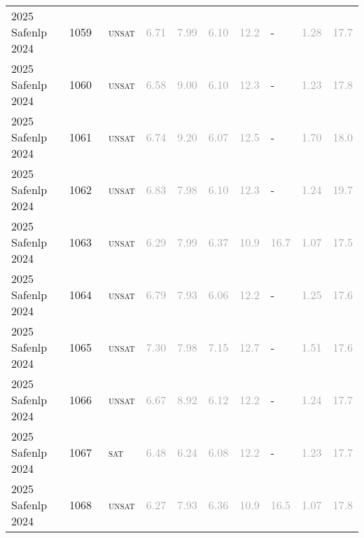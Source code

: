 \begin{center}
{\begin{longtable}{@{}llllllllll@{}}
2025 Safenlp 2024 & 1059 & ~\textsc{unsat} & \textcolor{darkgray}{6.71} & \textcolor{darkgray}{7.99} & \textcolor{darkgray}{6.10} & \textcolor{darkgray}{12.2} & - & \textcolor{darkgray}{1.28} & \textcolor{darkgray}{17.7} \\
2025 Safenlp 2024 & 1060 & ~\textsc{unsat} & \textcolor{darkgray}{6.58} & \textcolor{darkgray}{9.00} & \textcolor{darkgray}{6.10} & \textcolor{darkgray}{12.3} & - & \textcolor{darkgray}{1.23} & \textcolor{darkgray}{17.8} \\
2025 Safenlp 2024 & 1061 & ~\textsc{unsat} & \textcolor{darkgray}{6.74} & \textcolor{darkgray}{9.20} & \textcolor{darkgray}{6.07} & \textcolor{darkgray}{12.5} & - & \textcolor{darkgray}{1.70} & \textcolor{darkgray}{18.0} \\
2025 Safenlp 2024 & 1062 & ~\textsc{unsat} & \textcolor{darkgray}{6.83} & \textcolor{darkgray}{7.98} & \textcolor{darkgray}{6.10} & \textcolor{darkgray}{12.3} & - & \textcolor{darkgray}{1.24} & \textcolor{darkgray}{19.7} \\
2025 Safenlp 2024 & 1063 & ~\textsc{unsat} & \textcolor{darkgray}{6.29} & \textcolor{darkgray}{7.99} & \textcolor{darkgray}{6.37} & \textcolor{darkgray}{10.9} & \textcolor{darkgray}{16.7} & \textcolor{darkgray}{1.07} & \textcolor{darkgray}{17.5} \\
2025 Safenlp 2024 & 1064 & ~\textsc{unsat} & \textcolor{darkgray}{6.79} & \textcolor{darkgray}{7.93} & \textcolor{darkgray}{6.06} & \textcolor{darkgray}{12.2} & - & \textcolor{darkgray}{1.25} & \textcolor{darkgray}{17.6} \\
2025 Safenlp 2024 & 1065 & ~\textsc{unsat} & \textcolor{darkgray}{7.30} & \textcolor{darkgray}{7.98} & \textcolor{darkgray}{7.15} & \textcolor{darkgray}{12.7} & - & \textcolor{darkgray}{1.51} & \textcolor{darkgray}{17.6} \\
2025 Safenlp 2024 & 1066 & ~\textsc{unsat} & \textcolor{darkgray}{6.67} & \textcolor{darkgray}{8.92} & \textcolor{darkgray}{6.12} & \textcolor{darkgray}{12.2} & - & \textcolor{darkgray}{1.24} & \textcolor{darkgray}{17.7} \\
2025 Safenlp 2024 & 1067 & ~\textsc{sat} & \textcolor{darkgray}{6.48} & \textcolor{darkgray}{6.24} & \textcolor{darkgray}{6.08} & \textcolor{darkgray}{12.2} & - & \textcolor{darkgray}{1.23} & \textcolor{darkgray}{17.7} \\
2025 Safenlp 2024 & 1068 & ~\textsc{unsat} & \textcolor{darkgray}{6.27} & \textcolor{darkgray}{7.93} & \textcolor{darkgray}{6.36} & \textcolor{darkgray}{10.9} & \textcolor{darkgray}{16.5} & \textcolor{darkgray}{1.07} & \textcolor{darkgray}{17.8} \\

\end{longtable}}
\end{center}
